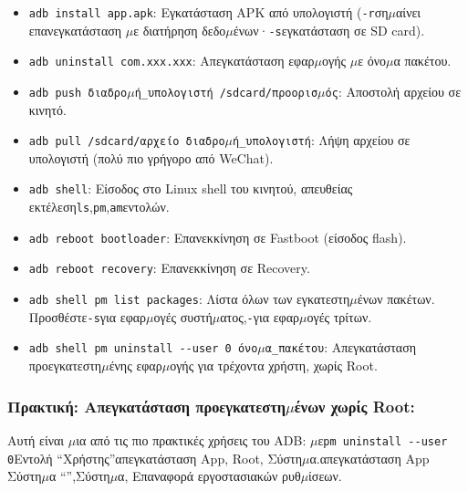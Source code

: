 \begin{itemize}
  \item \texttt{adb install app.\allowbreak apk}: Εγκατάσταση APK από υπολογιστή (\texttt{-\allowbreak r}ση$\mu$αίνει επανεγκατάσταση $\mu$ε διατήρηση δεδο$\mu$ένων·\texttt{-\allowbreak s}εγκατάσταση σε SD card).
  \item \texttt{adb uninstall com.\allowbreak xxx.\allowbreak xxx}: Απεγκατάσταση εφαρ$\mu$ογής $\mu$ε όνο$\mu$α πακέτου.
  \item \texttt{adb push διαδρο$\mu$ή\_υπολογιστή /\allowbreak sdcard/\allowbreak προορισ$\mu$ός}: Αποστολή αρχείου σε κινητό.
  \item \texttt{adb pull /\allowbreak sdcard/\allowbreak αρχείο διαδρο$\mu$ή\_υπολογιστή}: Λήψη αρχείου σε υπολογιστή (πολύ πιο γρήγορο από WeChat).
  \item \texttt{adb shell}: Είσοδος στο Linux shell του κινητού, απευθείας εκτέλεση\texttt{ls},\texttt{pm},\texttt{am}εντολών.
  \item \texttt{adb reboot bootloader}: Επανεκκίνηση σε Fastboot (είσοδος flash).
  \item \texttt{adb reboot recovery}: Επανεκκίνηση σε Recovery.
  \item \texttt{adb shell pm list packages}: Λίστα όλων των εγκατεστη$\mu$ένων πακέτων. Προσθέστε\texttt{-\allowbreak s}για εφαρ$\mu$ογές συστή$\mu$ατος,\texttt{-}για εφαρ$\mu$ογές τρίτων.
  \item \texttt{adb shell pm uninstall -\allowbreak -\allowbreak user 0 όνο$\mu$α\_πακέτου}: Απεγκατάσταση προεγκατεστη$\mu$ένης εφαρ$\mu$ογής για τρέχοντα χρήστη, χωρίς Root.
\end{itemize}

\subsubsection*{Πρακτική: Απεγκατάσταση προεγκατεστη$\mu$ένων χωρίς Root:}

Αυτή είναι $\mu$ια από τις πιο πρακτικές χρήσεις του ADB: $\mu$ε\texttt{pm uninstall -\allowbreak -\allowbreak user 0}Εντολή “Χρήστης”απεγκατάσταση App, Root, Σύστη$\mu$α.απεγκατάσταση App Σύστη$\mu$α “”,Σύστη$\mu$α, Επαναφορά εργοστασιακών ρυθ$\mu$ίσεων.

